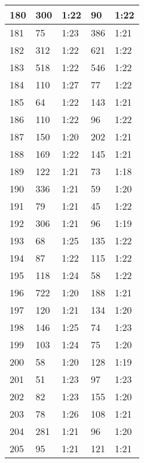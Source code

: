 \begin{center}
\begin{longtable}{|p{2cm}|l|l|l|l|}
180	&   300           &  1:22  &		90      	& 1:22 \\ \hline
181	&   75            &  1:23  &		386     	& 1:21 \\ \hline
182	&   312           &  1:22  &		621     	& 1:22 \\ \hline
183	&   518           &  1:22  &		546     	& 1:22 \\ \hline
184	&   110           &  1:27  &		77      	& 1:22 \\ \hline
185	&   64            &  1:22  &		143     	& 1:21 \\ \hline
186	&   110           &  1:22  &		96      	& 1:22 \\ \hline
187	&   150           &  1:20  &		202     	& 1:21 \\ \hline
188	&   169           &  1:22  &		145     	& 1:21 \\ \hline
189	&   122           &  1:21  &		73      	& 1:18 \\ \hline
190	&   336           &  1:21  &		59      	& 1:20 \\ \hline
191	&   79            &  1:21  &		45      	& 1:22 \\ \hline
192	&   306           &  1:21  &		96      	& 1:19 \\ \hline
193	&   68            &  1:25  &		135     	& 1:22 \\ \hline
194	&   87            &  1:22  &		115     	& 1:22 \\ \hline
195	&   118           &  1:24  &		58      	& 1:22 \\ \hline
196	&   722           &  1:20  &		188     	& 1:21 \\ \hline
197	&   120           &  1:21  &		134     	& 1:20 \\ \hline
198	&   146           &  1:25  &		74      	& 1:23 \\ \hline
199	&   103           &  1:24  &		75      	& 1:20 \\ \hline
200	&   58            &  1:20  &		128     	& 1:19 \\ \hline
201	&   51            &  1:23  &		97      	& 1:23 \\ \hline
202	&   82            &  1:23  &		155     	& 1:20 \\ \hline
203	&   78            &  1:26  &		108     	& 1:21 \\ \hline
204	&   281           &  1:21  &		96      	& 1:20 \\ \hline
205	&   95            &  1:21  &		121     	& 1:21 \\ \hline

\end{longtable}
\end{center}
